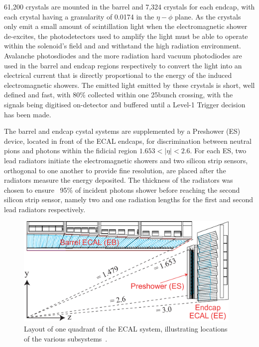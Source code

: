 61,200 crystals are mounted in the barrel and 7,324 crystals for each endcap, with each crystal having a granularity of 0.0174 in the $\eta - \phi$ plane.
As the crystals only emit a small amount of scintillation light when the electromagnetic shower de-excites, the photodetectors used to amplify the light must be able to operate within the solenoid's field and and withstand the high radiation environment.
Avalanche photosdiodes and the more radiation hard vacuum photodiodes are used in the barrel and endcap regions respectively to convert the light into an electrical current that is directly proportional to the energy of the induced electromagnetic showers.
The emitted light emitted by these crystals is short, well defined and fast, with 80\% collected within one 25\ns bunch crossing, with the signals being digitised on-detector and buffered until a Level-1 Trigger decision has been made.

The barrel and endcap cystal systems are supplemented by a Preshower (ES)~\cite{Loos:539819} device, located in front of the ECAL endcaps, for discrimination between neutral pions and photons within the fidicial region $1.653 < |\eta| < 2.6$.
For each ES, two lead radiators initiate the electromagnetic showers and two silicon strip sensors, orthogonal to one another to provide fine resolution, are placed after the radiators measure the energy deposited.
The thickness of the radiators was chosen to ensure ~95\% of incident photons shower before reaching the second silicon strip sensor, namely two and one radiation lengths for the first and second lead radiators respectively.

\begin{figure}[htbp]
\begin{center}
\includegraphics[width=0.97\textwidth]{figs/cms/ECAL_Transverse_section.pdf}
\caption{Layout of one quadrant of the ECAL system, illustrating locations of the various subsystems~\cite{Bayatian:2006nff}.}
\label{fig:ecal}
\end{center}
\end{figure}

